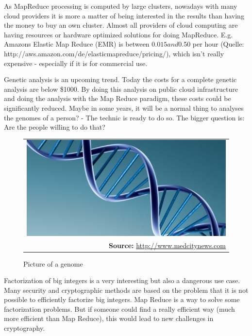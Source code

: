 As MapReduce processing is computed by large clusters, nowadays with many cloud providers it is more
a matter of being interested in the results than having the money to buy an own cluster. Almost all
providers of cloud computing are having resources or hardware optimized solutions for doing
MapReduce. E.g. Amazons Elastic Map Reduce (EMR) is between $0.015 and $0.50 per hour (Quelle:
http://aws.amazon.com/de/elasticmapreduce/pricing/), which isn’t really expensive - especially if it
is for commercial use.

Genetic analysis is an upcoming trend. Today the costs for a complete genetic analysis are below
\$1000. By doing this analysis on public cloud infrastructure and doing the analysis with the Map
Reduce paradigm, these costs could be significantly reduced. Maybe in some years, it will be a
normal thing to analyses the genomes of a person? - The technic is ready to do so. The bigger
question is: Are the people willing to do that?

\begin{figure} [!htb]
	\begin{center}
		  \begin{tabular}{@{}r@{}}
		{\includegraphics[width=14cm]{images/genome.jpg}}\\
		\footnotesize\sffamily\textbf{Source:} \url{http://www.medcitynews.com}
	  		   \cite{genomePicture} 
 	 	 \end{tabular}
		\caption{Picture of a genome}
		\label{fig:genome}
	\end{center}
\end{figure}\FloatBarrier

Factorization of big integers is a very interesting but also a dangerous use case. Many security and
cryptographic methods are based on the problem that it is not possible to efficiently factorize big
integers. Map Reduce is a way to solve some factorization problems. But if someone could find a
really efficient way (much more efficient than Map Reduce), this would lead to new challenges in
cryptography.

